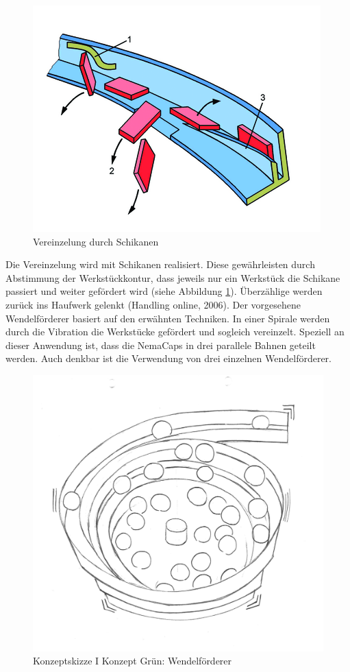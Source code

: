 \begin{figure}
	\includegraphics[scale=2.0]{Illustrationen/5-Konzept/schikane.png}
	\caption{Vereinzelung durch Schikanen}
	\label{fig:schikane}
\end{figure}


Die Vereinzelung wird mit Schikanen realisiert. Diese gewährleisten durch Abstimmung der Werkstückkontur, dass jeweils nur ein Werkstück die Schikane passiert und weiter gefördert wird (siehe Abbildung \ref{fig:schikane}). Überzählige werden zurück ins Haufwerk gelenkt (Handling online, 2006).
\newline
Der vorgesehene Wendelförderer basiert auf den erwähnten Techniken. In einer Spirale werden durch die Vibration die Werkstücke gefördert und sogleich vereinzelt. Speziell an dieser Anwendung ist, dass die NemaCaps in drei parallele Bahnen geteilt werden. Auch denkbar ist die Verwendung von drei einzelnen Wendelförderer.
\newline
\begin{figure}[H]
	\includegraphics[scale=0.6]{Illustrationen/5-Konzept/green_wendelfoerderer.jpg}
	\caption{Konzeptskizze I Konzept Grün: Wendelförderer}
	\label{fig:vereinzelung_green}
\end{figure}

